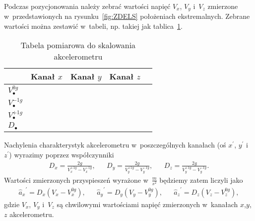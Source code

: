 \documentclass[paper=a4,DIV=12]{lpas}
\begin{document}
Podczas pozycjonowania należy zebrać wartości napięć $V_x$, $V_y$ i~$V_z$
zmierzone w~przedstawionych na rysunku~\ref{fig:ZDELS} położeniach
ekstremalnych. Zebrane wartości można zestawić w~tabeli, np. takiej jak
tablica~\ref{tab:Q31HW}.
\begin{table}[htbp]
  \centering
  \caption{Tabela pomiarowa do skalowania akcelerometru}
  \label{tab:Q31HW}
  \begin{tabular}{|l|c|c|c|c|}
    \hline
                        & Kanał $x$ & Kanał $y$ & Kanał $z$ \\ \hline
    $V_{\bullet}^{0g}$  &           &           &           \\ \hline
    $V_{\bullet}^{-1g}$ &           &           &           \\ \hline
    $V_{\bullet}^{+1g}$ &           &           &           \\ \hline
    $D_{\bullet}$       &           &           &           \\ \hline
  \end{tabular}
\end{table}

Nachylenia charakterystyk akcelerometru w~poszczególnych kanałach (oś $x^{\prime}$,
$y^{\prime}$ i~$z^{\prime}$) wyrazimy poprzez współczynniki
\begin{align}
  & D_x = \frac{2 g}{V_x^{+1g} - V_x^{-1g}}, &
  & D_y = \frac{2 g}{V_y^{+1g} - V_y^{-1g}}, &
  & D_z = \frac{2 g}{V_y^{+1g} - V_y^{-1g}}. &
  \label{eq:TUSWM}
\end{align}
Wartości zmierzonych przyspieszeń wyrażone w~$\tfrac{m}{s^2}$ będziemy zatem
liczyli jako
\begin{align}
  &{\hat{a}_x}^{\prime}= D_x \left(V_x - V_x^{0g}\right),&
  &{\hat{a}_y}^{\prime}= D_y \left(V_y - V_y^{0g}\right),&
  &{\hat{a}_z}^{\prime}= D_z \left(V_z - V_z^{0g}\right),&
  \label{eq:HM7PF}
\end{align}
gdzie $V_x$, $V_y$ i~$V_z$ są chwilowymi wartościami napięć zmierzonych
w~kanałach $x$,$y$,$z$ akcelerometru.
\end{document}
